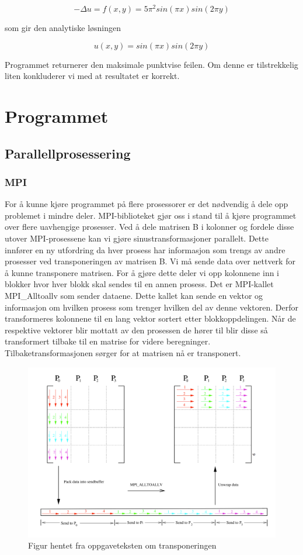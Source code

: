 \documentclass[11pt,norsk,a4paper]{article}
\begin{document}
$$ -\Delta u = f(x,y) = 5\pi^2sin(\pi x)sin(2\pi y) $$

som gir den analytiske løsningen

$$ u(x,y) = sin(\pi x)sin(2\pi y) $$

Programmet returnerer den maksimale punktvise feilen. Om denne er tilstrekkelig liten konkluderer vi med at resultatet er korrekt. 


\section{Programmet}

\subsection{Parallellprosessering}

\subsubsection{MPI}
For å kunne kjøre programmet på flere prosessorer er det nødvendig å dele opp problemet i mindre deler. MPI-biblioteket\cite{MPI} gjør oss i stand til å kjøre programmet over flere uavhengige prosesser. Ved å dele matrisen B i kolonner og fordele disse utover MPI-prosessene kan vi gjøre sinustransformasjoner parallelt. Dette innfører en ny utfordring da hver prosess har informasjon som trengs av andre prosesser ved transponeringen av matrisen B. Vi må sende data over nettverk for å kunne transponere matrisen. For å gjøre dette deler vi opp kolonnene inn i blokker hvor hver blokk skal sendes til en annen prosess. Det er MPI-kallet MPI\_Alltoallv som sender dataene. Dette kallet kan sende en vektor og informasjon om hvilken prosess som trenger hvilken del av denne vektoren. Derfor transformeres kolonnene til en lang vektor sortert etter blokkoppdelingen. Når de respektive vektorer blir mottatt av den prosessen de hører til blir disse så transformert tilbake til en matrise for videre beregninger. Tilbaketransformasjonen sørger for at matrisen nå er transponert.

\begin{figure}[h]
\centering
\includegraphics[scale=0.3]{transpose.png}
\caption{Figur hentet fra oppgaveteksten om transponeringen}
\end{figure}
\end{document}
